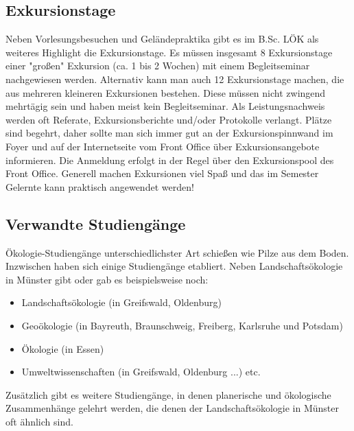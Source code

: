 \subsection*{Exkursionstage}
Neben Vorlesungsbesuchen und Geländepraktika gibt es im B.Sc. LÖK als weiteres Highlight die Exkursionstage. Es müssen insgesamt 8 Exkursionstage einer "großen" Exkursion (ca. 1 bis 2 Wochen) mit einem Begleitseminar nachgewiesen werden.
Alternativ kann man auch 12 Exkursionstage machen, die aus mehreren kleineren Exkursionen bestehen. Diese müssen nicht zwingend mehrtägig sein und haben meist kein Begleitseminar. Als Leistungsnachweis werden oft Referate, Exkursionsberichte und/oder Protokolle verlangt. Plätze sind begehrt, daher sollte man sich immer gut an der Exkursionspinnwand im Foyer und auf der Internetseite vom Front Office über Exkursionsangebote informieren. Die Anmeldung erfolgt in der Regel über den Exkursionspool des Front Office. Generell machen Exkursionen viel Spaß und das im Semester Gelernte kann praktisch angewendet werden!

\subsection*{Verwandte Studiengänge}
Ökologie-Studiengänge unterschiedlichster Art schießen wie Pilze aus dem Boden. Inzwischen haben sich einige Studiengänge etabliert. Neben Landschaftsökologie in Münster gibt oder gab es beispielsweise noch:
\begin{itemize}
  \item Landschaftsökologie (in Greifswald, Oldenburg)
  \item Geoökologie (in Bayreuth, Braunschweig, Freiberg, Karlsruhe und Potsdam)
  \item Ökologie (in Essen)
  \item Umweltwissenschaften (in Greifswald, Oldenburg ...) etc.
\end{itemize}
Zusätzlich gibt es weitere Studiengänge, in denen planerische und ökologische Zusammenhänge gelehrt werden, die denen der Landschaftsökologie in Münster oft ähnlich sind. 

